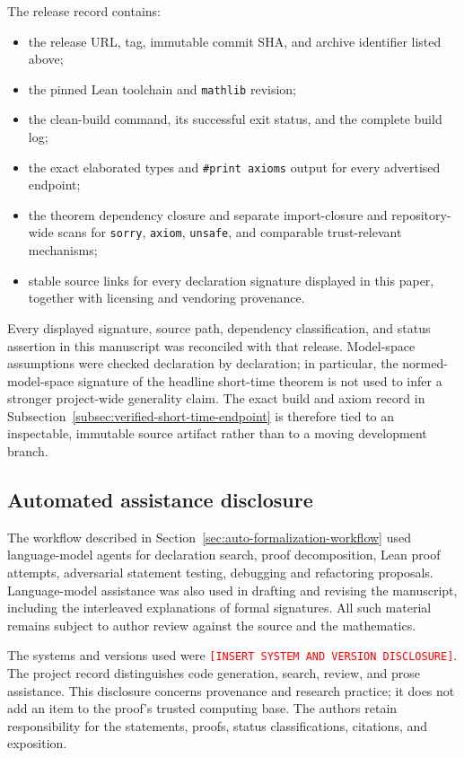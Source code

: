 \documentclass[11pt]{article}
\theoremstyle{plain}
\theoremstyle{definition}
\theoremstyle{remark}
\begin{document}
The release record contains:

\begin{itemize}[leftmargin=2em]
  \item the release URL, tag, immutable commit SHA, and archive identifier
  listed above;
  \item the pinned Lean toolchain and \texttt{mathlib} revision;
  \item the clean-build command, its successful exit status, and the complete
  build log;
  \item the exact elaborated types and \texttt{\#print axioms} output for every
  advertised endpoint;
  \item the theorem dependency closure and separate import-closure and
  repository-wide scans for \texttt{sorry}, \texttt{axiom}, \texttt{unsafe},
  and comparable trust-relevant mechanisms;
  \item stable source links for every declaration signature displayed in this
  paper, together with licensing and vendoring provenance.
\end{itemize}

Every displayed signature, source path, dependency classification, and status
assertion in this manuscript was reconciled with that release.  Model-space
assumptions were checked declaration by declaration; in particular, the
normed-model-space signature of the headline short-time theorem is not used to
infer a stronger project-wide generality claim.  The exact build and axiom
record in Subsection~\ref{subsec:verified-short-time-endpoint} is therefore tied
to an inspectable, immutable source artifact rather than to a moving
development branch.

\subsection{Automated assistance disclosure}
\label{subsec:automated-assistance-disclosure}

The workflow described in Section~\ref{sec:auto-formalization-workflow} used
language-model agents for declaration search, proof decomposition, Lean proof
attempts, adversarial statement testing, debugging and refactoring proposals.
Language-model assistance was also used in drafting and revising the
manuscript, including the interleaved explanations of formal signatures.  All
such material remains subject to author review against the source and the
mathematics.

The systems and versions used were
\textcolor{red}{\texttt{[INSERT SYSTEM AND VERSION DISCLOSURE]}}.  The project
record distinguishes code generation, search, review, and prose assistance.
This disclosure concerns provenance and research practice; it does not add an
item to the proof's trusted computing base.  The authors retain responsibility
for the statements, proofs, status classifications, citations, and exposition.
\end{document}
